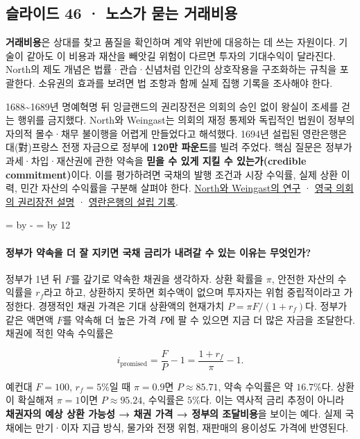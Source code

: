 \documentclass[10pt,a4paper]{article}
\newcommand{\ReserveQuestionSpace}{%
  \par\begingroup
  \dimen0=\pagegoal \advance\dimen0 by -\pagetotal
  \dimen2=\baselineskip \multiply\dimen2 by 12
  \ifdim\dimen0<\dimen2 \newpage\fi
  \endgroup}
\begin{document}
\subsection{슬라이드 46 · 노스가 묻는 거래비용}
\textbf{거래비용}은 상대를 찾고 품질을 확인하며 계약 위반에 대응하는 데 쓰는 자원이다. 기술이 같아도 이 비용과 재산을 빼앗길 위험이 다르면 투자의 기대수익이 달라진다. North의 제도 개념은 법률·관습·신념처럼 인간의 상호작용을 구조화하는 규칙을 포괄한다. 소유권의 효과를 보려면 법 조항과 함께 실제 집행 기록을 조사해야 한다.\par

1688\textasciitilde{}1689년 명예혁명 뒤 잉글랜드의 권리장전은 의회의 승인 없이 왕실이 조세를 걷는 행위를 금지했다. North와 Weingast는 의회의 재정 통제와 독립적인 법원이 정부의 자의적 몰수·채무 불이행을 어렵게 만들었다고 해석했다. 1694년 설립된 영란은행은 대(對)프랑스 전쟁 자금으로 정부에 \textbf{120만 파운드}를 빌려 주었다. 핵심 질문은 정부가 과세·차입·재산권에 관한 약속을 \textbf{믿을 수 있게 지킬 수 있는가(credible commitment)}이다. 이를 평가하려면 국채의 발행 조건과 시장 수익률, 실제 상환 이력, 민간 자산의 수익률을 구분해 살펴야 한다. \href{https://cdn-dev.vanderbilt.edu/t2-my-dev/wp-content/uploads/sites/138/2016/12/NorthWeingast-1989-Constitutions-and-Commitment.pdf}{North와 Weingast의 연구} · \href{https://www.parliament.uk/about/living-heritage/evolutionofparliament/parliamentaryauthority/revolution/overview/billofrights/}{영국 의회의 권리장전 설명} · \href{https://www.bankofengland.co.uk/explainers/who-owns-the-bank-of-england}{영란은행의 설립 기록}.\par

\ReserveQuestionSpace
\paragraph{정부가 약속을 더 잘 지키면 국채 금리가 내려갈 수 있는 이유는 무엇인가?}
정부가 1년 뒤 $F$를 갚기로 약속한 채권을 생각하자. 상환 확률을 $\pi$, 안전한 자산의 수익률을 $r_f$라고 하고, 상환하지 못하면 회수액이 없으며 투자자는 위험 중립적이라고 가정한다. 경쟁적인 채권 가격은 기대 상환액의 현재가치 $P=\pi F/(1+r_f)$다. 정부가 같은 액면액 $F$를 약속해 더 높은 가격 $P$에 팔 수 있으면 지금 더 많은 자금을 조달한다. 채권에 적힌 약속 수익률은\par

\[
i_{\mathrm{promised}}=\frac{F}{P}-1=\frac{1+r_f}{\pi}-1.
\]

예컨대 $F=100$, $r_f=5\%$일 때 $\pi=0.9$면 $P\approx85.71$, 약속 수익률은 약 $16.7\%$다. 상환이 확실해져 $\pi=1$이면 $P\approx95.24$, 수익률은 $5\%$다. 이는 역사적 금리 추정이 아니라 \textbf{채권자의 예상 상환 가능성 → 채권 가격 → 정부의 조달비용}을 보이는 예다. 실제 국채에는 만기·이자 지급 방식, 물가와 전쟁 위험, 재판매의 용이성도 가격에 반영된다.\par
\end{document}
